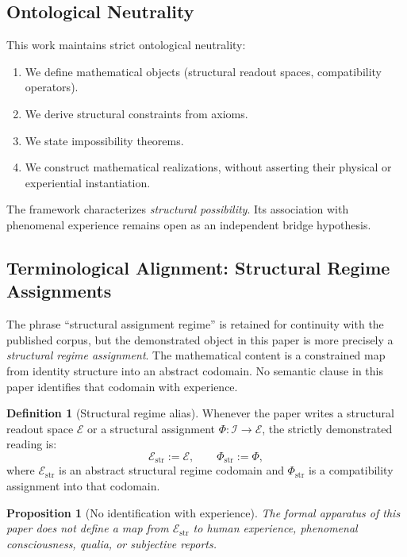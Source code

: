 \documentclass[11pt,a4paper]{article}
\theoremstyle{plain}
\newtheorem{proposition}[theorem]{Proposition}
\theoremstyle{definition}
\newtheorem{definition}[theorem]{Definition}
\theoremstyle{remark}
\begin{document}
\subsection{Ontological Neutrality}

This work maintains strict ontological neutrality:
\begin{enumerate}[leftmargin=*]
    \item We define mathematical objects (structural readout spaces, compatibility operators).
    \item We derive structural constraints from axioms.
    \item We state impossibility theorems.
    \item We construct mathematical realizations, without asserting their physical or experiential instantiation.
\end{enumerate}

The framework characterizes \textit{structural possibility}. Its association with phenomenal experience remains open as an independent bridge hypothesis.

\subsection{Terminological Alignment: Structural Regime Assignments}

The phrase ``structural assignment regime'' is retained for continuity with the
published corpus, but the demonstrated object in this paper is more precisely a
\emph{structural regime assignment}. The mathematical content is a constrained
map from identity structure into an abstract codomain. No semantic clause in
this paper identifies that codomain with experience.

\begin{definition}[Structural regime alias]\label{def:structural-regime-alias}
Whenever the paper writes a structural readout space $\mathcal{E}$ or a
structural assignment $\Phi:\mathcal{I}\to\mathcal{E}$, the strictly
demonstrated reading is:
\[
\mathcal{E}_{\mathrm{str}}:=\mathcal{E},
\qquad
\Phi_{\mathrm{str}}:=\Phi,
\]
where $\mathcal{E}_{\mathrm{str}}$ is an abstract structural regime codomain and
$\Phi_{\mathrm{str}}$ is a compatibility assignment into that codomain.
\end{definition}

\begin{proposition}[No identification with experience]\label{prop:no-experience-identification}
The formal apparatus of this paper does not define a map from
$\mathcal{E}_{\mathrm{str}}$ to human experience, phenomenal consciousness,
qualia, or subjective reports.
\end{proposition}
\end{document}

